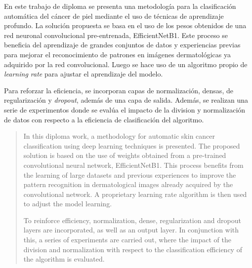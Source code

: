 \begin{resumen}		
	En este trabajo de diploma se presenta una metodología para la clasificación automática del cáncer de piel mediante el uso de técnicas de aprendizaje profundo. La solución propuesta se basa en el uso de los pesos obtenidos de una red neuronal convolucional pre-entrenada, EfficientNetB1. Este proceso se beneficia del aprendizaje de grandes conjuntos de datos y experiencias previas para mejorar el reconocimiento de patrones en imágenes dermatológicas ya adquirido por la red convolucional. Luego se hace uso de un algoritmo propio de \textit{learning rate} para ajustar el aprendizaje del modelo.

	Para reforzar la eficiencia, se incorporan capas de normalización, densas, de regularización y \textit{dropout}, además de una capa de salida. Además, se realizan una serie de experimentos donde se evalúa el impacto de la division y normalización de datos con respecto a la eficiencia de clasificación del algoritmo.

\end{resumen}

\begin{abstract}	
	In this diploma work, a methodology for automatic skin cancer classification using deep learning techniques is presented. The proposed solution is based on the use of weights obtained from a pre-trained convolutional neural network, EfficientNetB1. This process benefits from the learning of large datasets and previous experiences to improve the pattern recognition in dermatological images already acquired by the convolutional network. A proprietary learning rate algorithm is then used to adjust the model learning.

	To reinforce efficiency, normalization, dense, regularization and dropout layers are incorporated, as well as an output layer. In conjunction with this, a series of experiments are carried out, where the impact of the division and normalization with respect to the classification efficiency of the algorithm is evaluated.
\end{abstract}